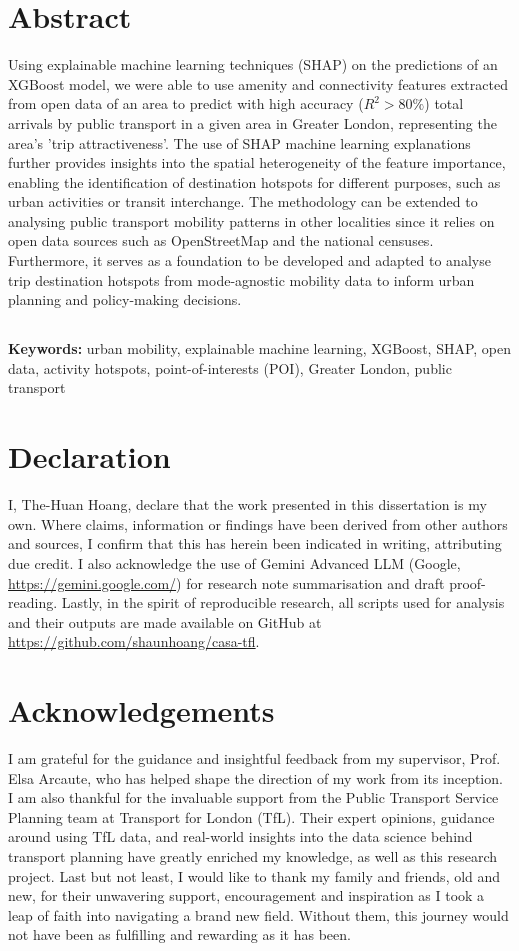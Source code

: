 \chapter*{Abstract}
Using explainable machine learning techniques (SHAP) on the predictions of an XGBoost model, we were able to use amenity and connectivity features extracted from open data of an area to predict with high accuracy ($R^2>80\%$) total arrivals by public transport in a given area in Greater London, representing the area's 'trip attractiveness'. The use of SHAP machine learning explanations further provides insights into the spatial heterogeneity of the feature importance, enabling the identification of destination hotspots for different purposes, such as urban activities or transit interchange. The methodology can be extended to analysing public transport mobility patterns in other localities since it relies on open data sources such as OpenStreetMap and the national censuses. Furthermore, it serves as a foundation to be developed and adapted to analyse trip destination hotspots from mode-agnostic mobility data to inform urban planning and policy-making decisions.

\section*{}
\textbf{Keywords:} urban mobility, explainable machine learning, XGBoost, SHAP, open data, activity hotspots, point-of-interests (POI), Greater London, public transport

\chapter*{Declaration}
I, The-Huan Hoang, declare that the work presented in this dissertation is my own. Where claims, information or findings have been derived from other authors and sources, I confirm that this has herein been indicated in writing, attributing due credit. I also acknowledge the use of Gemini Advanced LLM (Google, \url{https://gemini.google.com/}) for research note summarisation and draft proof-reading. Lastly, in the spirit of reproducible research, all scripts used for analysis and their outputs are made available on GitHub at \url{https://github.com/shaunhoang/casa-tfl}. 

\chapter*{Acknowledgements}
I am grateful for the guidance and insightful feedback from my supervisor, Prof. Elsa Arcaute, who has helped shape the direction of my work from its inception. I am also thankful for the invaluable support from the Public Transport Service Planning team at Transport for London (TfL). Their expert opinions, guidance around using TfL data, and real-world insights into the data science behind transport planning have greatly enriched my knowledge, as well as this research project. Last but not least, I would like to thank my family and friends, old and new, for their unwavering support, encouragement and inspiration as I took a leap of faith into navigating a brand new field. Without them, this journey would not have been as fulfilling and rewarding as it has been.

\tableofcontents

\listoffigures

\listoftables